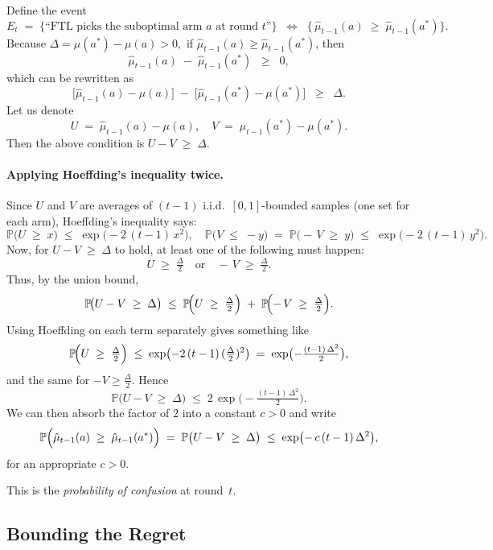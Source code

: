 Define the event
\[
  E_t 
  \;=\;
  \bigl\{\text{``FTL picks the suboptimal arm $a$ at round $t$''}\bigr\}
  \;\;\Longleftrightarrow\;\;
  \bigl\{\,\hat{\mu}_{t-1}(a) \;\ge\;\hat{\mu}_{t-1}(a^*)\bigr\}.
\]
Because $\Delta = \mu(a^*) - \mu(a) > 0,$ if $\hat{\mu}_{t-1}(a) \ge \hat{\mu}_{t-1}(a^*)$, then
\[
   \hat{\mu}_{t-1}(a) 
   \;-\;
   \hat{\mu}_{t-1}(a^*)
   \;\;\ge\;\;0,
\]
which can be rewritten as
\[
  \bigl[\hat{\mu}_{t-1}(a) - \mu(a)\bigr]
  \;-\;
  \bigl[\hat{\mu}_{t-1}(a^*) - \mu(a^*)\bigr]
  \;\;\ge\;\;\Delta.
\]
Let us denote 
\[
  U \;=\;\hat{\mu}_{t-1}(a) - \mu(a), 
  \quad
  V \;=\;\hat{\mu}_{t-1}(a^*) - \mu(a^*).
\]
Then the above condition is $U - V \;\ge\; \Delta$.  

\paragraph{Applying Hoeffding's inequality twice.}
Since $U$ and $V$ are averages of $(t-1)$ i.i.d.\ $[0,1]$-bounded samples (one set for each arm), Hoeffding's inequality says:
\[
  \mathbb{P}\bigl(U \;\ge\; x\bigr)
  \;\le\;
  \exp\bigl(-2\,(t-1)\,x^2\bigr),
  \quad
  \mathbb{P}\bigl(V \;\le\; -y\bigr)
  \;=\;
  \mathbb{P}\bigl(-\,V \;\ge\; y\bigr)
  \;\le\;
  \exp\bigl(-2\,(t-1)\,y^2\bigr).
\]
Now, for $U - V \;\ge\;\Delta$ to hold, at least one of the following must happen:
\[
  U \;\ge\; \tfrac{\Delta}{2}
  \quad\text{or}\quad
  -\,V \;\ge\;\tfrac{\Delta}{2}.
\]
Thus, by the union bound,
\[
  \mathbb{P}\!\bigl(U - V \;\ge\;\Delta\bigr)
  \;\le\;
  \mathbb{P}\!\Bigl(U \;\ge\; \tfrac{\Delta}{2}\Bigr)
  \;+\;
  \mathbb{P}\!\Bigl(-\,V \;\ge\;\tfrac{\Delta}{2}\Bigr).
\]
Using Hoeffding on each term separately gives something like
\[
  \mathbb{P}\!\Bigl(U \;\ge\; \tfrac{\Delta}{2}\Bigr)
  \;\le\;
  \exp\bigl(-2\,(t-1)\,(\tfrac{\Delta}{2})^2\bigr)
  \;=\;
  \exp\bigl(-\tfrac{(t-1)\,\Delta^2}{2}\bigr),
\]
and the same for $-V \ge \tfrac{\Delta}{2}$.  Hence
\[
  \mathbb{P}\!\bigl(U - V \;\ge\;\Delta\bigr)
  \;\le\;
  2 \,\exp\bigl(-\tfrac{(t-1)\,\Delta^2}{2}\bigr).
\]
We can then absorb the factor of $2$ into a constant $c>0$ and write
\[
  \mathbb{P}\Bigl(\hat{\mu}_{t-1}(a) \;\ge\;\hat{\mu}_{t-1}(a^*)\Bigr)
  \;=\;
  \mathbb{P}\bigl(U - V \;\ge\;\Delta\bigr)
  \;\le\;
  \exp\bigl(-\,c\,(t-1)\,\Delta^2\bigr),
\]
for an appropriate $c>0$.  

This is the \emph{probability of confusion} at round~$t$.

\subsection*{Bounding the Regret}

